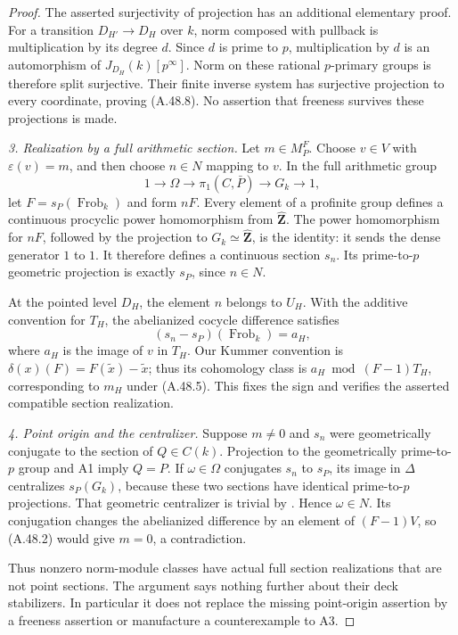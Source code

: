 \documentclass[11pt]{article}
\begin{document}
\begin{proof}
The asserted surjectivity of projection has an
additional elementary proof. For a transition
$D_{H'}\to D_H$ over $k$, norm composed with
pullback is multiplication by its degree $d$.
Since $d$ is prime to $p$, multiplication by $d$
is an automorphism of $J_{D_H}(k)[p^\infty]$.
Norm on these rational $p$-primary groups is
therefore split surjective. Their finite inverse
system has surjective projection to every
coordinate, proving (A.48.8). No assertion that
freeness survives these projections is made.

\emph{3. Realization by a full arithmetic section.}
Let $m\in M_P^F$. Choose $v\in V$ with
$\varepsilon(v)=m$, and then choose $n\in N$
mapping to $v$. In the full arithmetic group
\[
        1\longrightarrow\Omega\longrightarrow\pi_1(C,\bar P)
          \longrightarrow G_k\longrightarrow1,
\]
let $F=s_P(\operatorname{Frob}_k)$ and form
$nF$. Every element of a profinite group defines
a continuous procyclic power homomorphism from
$\widehat{\mathbf Z}$. The power homomorphism for
$nF$, followed by the projection to
$G_k\simeq\widehat{\mathbf Z}$, is the identity:
it sends the dense generator $1$ to $1$.
It therefore defines a continuous section $s_n$.
Its prime-to-$p$ geometric projection is exactly
$s_P$, since $n\in N$.

At the pointed level $D_H$, the element $n$ belongs
to $U_H$. With the additive convention for
$T_H$, the abelianized cocycle difference satisfies
\[
      (s_n-s_P)(\operatorname{Frob}_k)=a_H,
                                                        \tag{A.48.7}
\]
where $a_H$ is the image of $v$ in $T_H$.
Our Kummer convention is
$\delta(x)(F)=F(\widetilde x)-\widetilde x$;
thus its cohomology class is
$a_H\bmod(F-1)T_H$, corresponding to $m_H$
under (A.48.5). This fixes the sign and verifies
the asserted compatible section realization.

\emph{4. Point origin and the centralizer.}
Suppose $m\ne0$ and $s_n$ were geometrically
conjugate to the section of $Q\in C(k)$.
Projection to the geometrically prime-to-$p$
group and A1 imply $Q=P$.
If $\omega\in\Omega$ conjugates $s_n$ to $s_P$,
its image in $\Delta$ centralizes $s_P(G_k)$,
because these two sections have identical
prime-to-$p$ projections. That geometric
centralizer is trivial by
\cite[Lemma~1.7]{AR_ST2009}. Hence $\omega\in N$.
Its conjugation changes the abelianized difference
by an element of $(F-1)V$, so (A.48.2) would
give $m=0$, a contradiction.

Thus nonzero norm-module classes have actual full
section realizations that are not point sections.
The argument says nothing further about their
deck stabilizers. In particular it does not replace
the missing point-origin assertion by a freeness
assertion or manufacture a counterexample to A3.
\end{proof}
\end{document}
